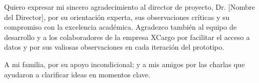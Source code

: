 \begin{acknowledgements}

Quiero expresar mi sincero agradecimiento al director de proyecto, Dr. [Nombre del Director], por su orientación experta, sus observaciones críticas y su compromiso con la excelencia académica. Agradezco también al equipo de desarrollo y a los colaboradores de la empresa XCargo por facilitar el acceso a datos y por sus valiosas observaciones en cada iteración del prototipo.

A mi familia, por su apoyo incondicional; y a mis amigos por las charlas que ayudaron a clarificar ideas en momentos clave.

\end{acknowledgements}
